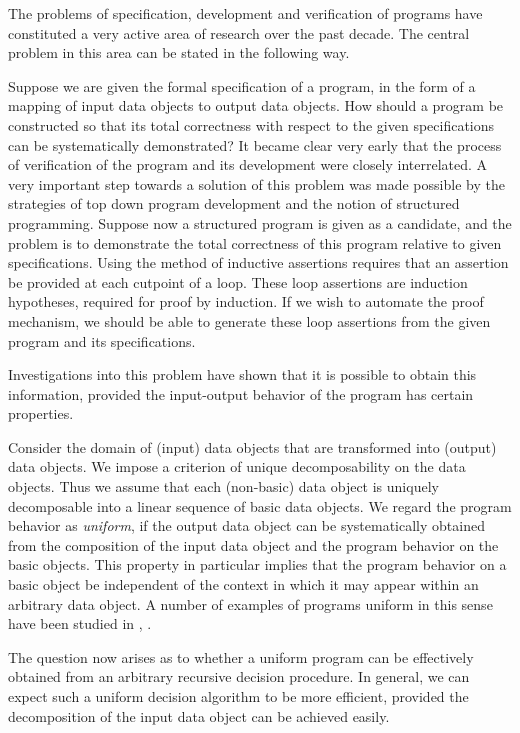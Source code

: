 The problems of specification, development and verification of programs have constituted
a very active area of research over the past decade.
The central problem in this area can be stated in the following way.

Suppose we are given the formal specification of a program, in the form of a mapping 
of input data objects to output data objects.
How should a program be constructed so that its total correctness with respect to the
given specifications can be systematically
demonstrated?
It became clear very early that the process of verification of the
program and its development were closely interrelated.
A very important step towards a
solution of this problem was made possible by the strategies of top down
program development and the notion of structured programming. \cite{}
Suppose now a structured program is given as a candidate, and the problem is to demonstrate
the total correctness of this program relative to given specifications.
Using the method of inductive assertions \cite{} requires that an assertion be provided at each
cutpoint of a loop.
These loop assertions are induction hypotheses, required for proof by induction.
If we wish to automate the proof mechanism, we should be able to generate these loop
assertions from the given program and its specifications.

Investigations into this problem have shown \cite{} that it is possible to obtain this
information, provided the input-output behavior of the program has certain properties.

Consider the domain of (input) data objects that are transformed into (output) data objects.
We impose a criterion of unique decomposability on the data objects.
Thus we assume that each (non-basic) data object is uniquely decomposable into a linear sequence of basic data objects.
We regard the program behavior as \emph{uniform}, if the output data object can be systematically
obtained from the composition of the input data object and the program behavior on the basic objects.
This property in particular implies that the program behavior on a basic object be independent
of the context in which it may appear within an arbitrary data object.
A number of examples of programs uniform in this sense have been studied in \cite{}, \cite{}.

The question now arises as to whether a uniform program can be effectively obtained
from an arbitrary recursive decision procedure.
In general, we can expect such a uniform decision algorithm to be more efficient, provided the decomposition
of the input data object can be achieved easily.

